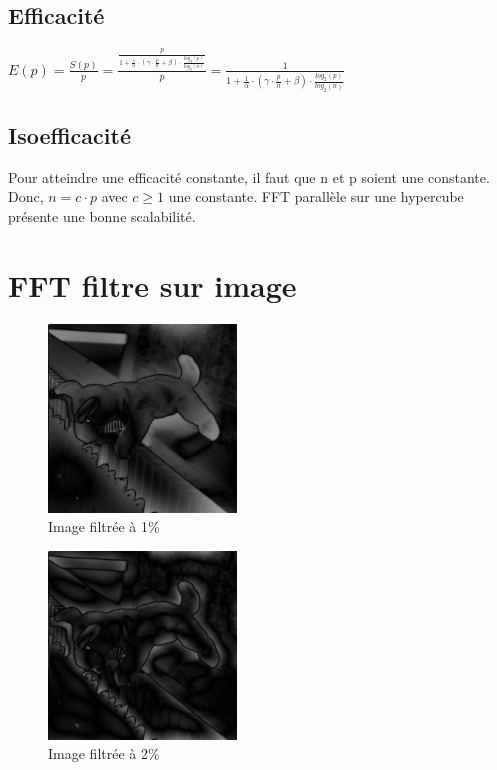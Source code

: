 \documentclass[a4paper]{article}
\begin{document}
\subsection{Efficacité}
\begin{center}
$E(p) = \frac{S(p)}{p} = \frac{\frac{p}{1 + \frac{1}{\alpha} \cdot ( \gamma \cdot \frac{p}{n} + \beta) \cdot \frac{log_2(p)}{log_2(n)}}}{p} = \frac{1}{1 + \frac{1}{\alpha} \cdot ( \gamma \cdot \frac{p}{n} + \beta) \cdot \frac{log_2(p)}{log_2(n)}}$
\end{center}

\subsection{Isoefficacité}
Pour atteindre une efficacité constante, il faut que n et p soient une constante. Donc, $n = c \cdot p $ avec $c \ge 1$ une constante.
FFT parallèle sur une hypercube présente une bonne scalabilité.

\newpage

\section{FFT filtre sur image}

\begin{figure}[!ht]
    \center
    \includegraphics[width=5cm]{../images/evert_filtre_01.png}
    \caption{Image filtrée à 1\%}
\end{figure}

\begin{figure}[!ht]
    \center
    \includegraphics[width=5cm]{../images/evert_filtre_02.png}
    \caption{Image filtrée à 2\%}
\end{figure}
\end{document}
